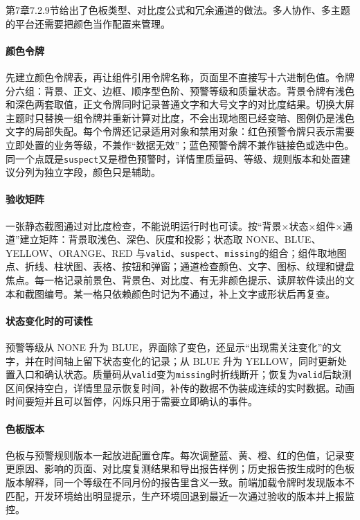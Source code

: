 第7章7.2.9节给出了色板类型、对比度公式和冗余通道的做法。多人协作、多主题的平台还需要把颜色当作配置来管理。

\paragraph{颜色令牌}先建立颜色令牌表，再让组件引用令牌名称，页面里不直接写十六进制色值。令牌分六组：背景、正文、边框、顺序型色阶、预警等级和质量状态。背景令牌有浅色和深色两套取值，正文令牌同时记录普通文字和大号文字的对比度结果。切换大屏主题时只替换一组令牌并重新计算对比度，不会出现地图已经变暗、图例仍是浅色文字的局部失配。每个令牌还记录适用对象和禁用对象：红色预警令牌只表示需要立即处置的业务等级，不兼作“数据无效”；蓝色预警令牌不兼作链接色或选中色。同一个点既是\texttt{suspect}又是橙色预警时，详情里质量码、等级、规则版本和处置建议分列为独立字段，颜色只是辅助。

\paragraph{验收矩阵}一张静态截图通过对比度检查，不能说明运行时也可读。按“背景×状态×组件×通道”建立矩阵：背景取浅色、深色、灰度和投影；状态取 NONE、BLUE、YELLOW、ORANGE、RED 与\texttt{valid}、\texttt{suspect}、\texttt{missing}的组合；组件取地图点、折线、柱状图、表格、按钮和弹窗；通道检查颜色、文字、图标、纹理和键盘焦点。每一格记录前景色、背景色、对比度、有无非颜色提示、读屏软件读出的文本和截图编号。某一格只依赖颜色时记为不通过，补上文字或形状后再复查。

\paragraph{状态变化时的可读性}预警等级从 NONE 升为 BLUE，界面除了变色，还显示“出现需关注变化”的文字，并在时间轴上留下状态变化的记录；从 BLUE 升为 YELLOW，同时更新处置入口和确认状态。质量码从\texttt{valid}变为\texttt{missing}时折线断开；恢复为\texttt{valid}后缺测区间保持空白，详情里显示恢复时间，补传的数据不伪装成连续的实时数据。动画时间要短并且可以暂停，闪烁只用于需要立即确认的事件。

\paragraph{色板版本}色板与预警规则版本一起放进配置仓库。每次调整蓝、黄、橙、红的色值，记录变更原因、影响的页面、对比度复测结果和导出报告样例；历史报告按生成时的色板版本解释，同一个等级在不同月份的报告里含义一致。前端加载令牌时发现版本不匹配，开发环境给出明显提示，生产环境回退到最近一次通过验收的版本并上报监控。

